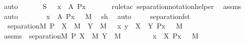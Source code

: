 \begin{isabellebody}
\ auto\ \isanewline
\ \ \isamarkupfalse%
\ \isamarkupfalse%
\ {\isachardoublequoteopen}S\ {\isacharequal}{\kern0pt}\ {\isacharbraceleft}{\kern0pt}\ x\ {\isasymin}\ A{\isachardot}{\kern0pt}\ P{\isacharparenleft}{\kern0pt}x{\isacharparenright}{\kern0pt}\ {\isacharbraceright}{\kern0pt}{\isachardoublequoteclose}\isanewline
\ \ \ \ \isamarkupfalse%
\ {\isacharparenleft}{\kern0pt}rule{\isacharunderscore}{\kern0pt}tac\ separation{\isacharunderscore}{\kern0pt}notation{\isacharunderscore}{\kern0pt}helper{\isacharparenright}{\kern0pt}\ \isamarkupfalse%
\ assms\ \isamarkupfalse%
\ auto\ \isanewline
\ \ \isamarkupfalse%
\ \isamarkupfalse%
\ {\isachardoublequoteopen}{\isacharbraceleft}{\kern0pt}\ x\ {\isasymin}\ A{\isachardot}{\kern0pt}\ P{\isacharparenleft}{\kern0pt}x{\isacharparenright}{\kern0pt}\ {\isacharbraceright}{\kern0pt}\ {\isasymin}\ M{\isachardoublequoteclose}\ \isamarkupfalse%
\ sh\ \isamarkupfalse%
\ auto\ \isanewline
{}\isamarkupfalse%
%
\endisatagproof
{\isafoldproof}%
%
\isadelimproof
\ \ \isanewline
%
\endisadelimproof
\isanewline
\isanewline
{}\isamarkupfalse%
\ separation{\isacharunderscore}{\kern0pt}fst\ {\isacharcolon}{\kern0pt}\isanewline
\ \ {\isachardoublequoteopen}separation{\isacharparenleft}{\kern0pt}{\isacharhash}{\kern0pt}{\isacharhash}{\kern0pt}M{\isacharcomma}{\kern0pt}\ P{\isacharparenright}{\kern0pt}\ {\isasymLongrightarrow}\ X\ {\isasymin}\ M\ {\isasymLongrightarrow}\ Y\ {\isasymin}\ M\ {\isasymLongrightarrow}\ {\isacharbraceleft}{\kern0pt}\ {\isacharless}{\kern0pt}x{\isacharcomma}{\kern0pt}\ y{\isachargreater}{\kern0pt}\ {\isasymin}\ X\ {\isasymtimes}\ Y{\isachardot}{\kern0pt}\ P{\isacharparenleft}{\kern0pt}x{\isacharparenright}{\kern0pt}\ {\isacharbraceright}{\kern0pt}\ {\isasymin}\ M{\isachardoublequoteclose}\ \ \ \isanewline
%
\isadelimproof
%
\endisadelimproof
%
\isatagproof
{}\isamarkupfalse%
\ {\isacharminus}{\kern0pt}\ \isanewline
\ \ \isamarkupfalse%
\ assms\ {\isacharcolon}{\kern0pt}\ {\isachardoublequoteopen}separation{\isacharparenleft}{\kern0pt}{\isacharhash}{\kern0pt}{\isacharhash}{\kern0pt}M{\isacharcomma}{\kern0pt}\ P{\isacharparenright}{\kern0pt}{\isachardoublequoteclose}\ {\isachardoublequoteopen}X\ {\isasymin}\ M{\isachardoublequoteclose}\ {\isachardoublequoteopen}Y\ {\isasymin}\ M{\isachardoublequoteclose}\ \ \isanewline
\ \ \isamarkupfalse%
\ \isamarkupfalse%
\ {\isachardoublequoteopen}{\isacharbraceleft}{\kern0pt}\ x\ {\isasymin}\ X{\isachardot}{\kern0pt}\ P{\isacharparenleft}{\kern0pt}x{\isacharparenright}{\kern0pt}\ {\isacharbraceright}{\kern0pt}\ {\isasymin}\ M{\isachardoublequoteclose}\ \isamarkupfalse%

\end{isabellebody}
